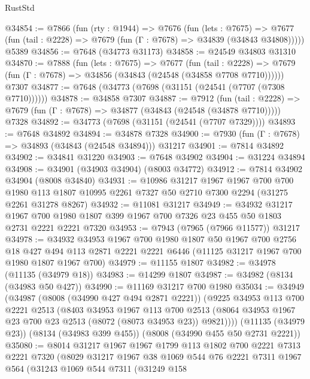 \begin{lexlean}{RustStd}
\begin{coremodule}
@34854 := @7866
    (fun (rty : @1944) =>
    @7676
      (fun (lets : @7675) =>
      @7677 (fun (tail : @2228) => @7679 (fun (Γ : @7678) => @34839 (@34843 @34808)))))
    @5389
@34856 := @7648 (@34773 @31173)
@34858 := @24549 @34803 @31310
@34870 := @7888
    (fun (lets : @7675) =>
    @7677
      (fun (tail : @2228) =>
      @7679 (fun (Γ : @7678) => @34856 (@34843 (@24548 (@34858 @7708 @7710))))))
    @7307
@34877 := @7648 (@34773 (@7698 (@31151 (@24541 (@7707 (@7308 @7710))))))
@34878 := @34858 @7307
@34887 := @7912
    (fun (tail : @2228) => @7679 (fun (Γ : @7678) => @34877 (@34843 (@24548 (@34878 @7710)))))
    @7328
@34892 := @34773 (@7698 (@31151 (@24541 (@7707 @7329))))
@34893 := @7648 @34892
@34894 := @34878 @7328
@34900 := @7930 (fun (Γ : @7678) => @34893 (@34843 (@24548 @34894))) @31217
@34901 := @7814 @34892
@34902 := @34841 @31220
@34903 := @7648 @34902
@34904 := @31224 @34894
@34908 := @34901 (@34903 @34904) (@8003 @34772)
@34912 := @7814 @34902 @34904 (@8008 @34840)
@34931 := @10986
    @31217
    @1967
    @1967
    @700
    @700
    @1980
    @113
    @1807
    @10995
    @2261
    @7327
    @50
    @2710
    @7300
    @2294
    (@31275 @2261 @31278 @8267)
@34932 := @11081 @31217
@34949 := @34932
    @31217
    @1967
    @700
    @1980
    @1807
    @399
    @1967
    @700
    @7326
    @23
    @455
    @50
    @1803
    @2731
    @2221
    @2221
    @7320
@34953 := @7943 (@7965 (@7966 @11577)) @31217
@34978 := @34932
    @34953
    @1967
    @700
    @1980
    @1807
    @50
    @1967
    @700
    @2756
    @18
    @427
    @494
    @113
    @2871
    @2221
    @2221
    @6446
    (@11125 @31217 @1967 @700 @1980 @1807 @1967 @700)
@34979 := @11155 @1807
@34982 := @34978 (@11135 (@34979 @18))
@34983 := @14299 @1807
@34987 := @34982 (@8134 (@34983 @50 @427))
@34990 := @11169 @31217 @700 @1980
@35034 := @34949
    (@34987
      (@8008 (@34990 @427 @494 @2871 @2221))
      (@9225
        @34953
        @113
        @700
        @2221
        @2513
        (@8403
          @34953
          @1967
          @113
          @700
          @2513
          (@8064 @34953 @1967 @23 @700 @23 @2513 (@8072 (@8073 @34953 @23)) @9821))))
    (@11135 (@34979 @23))
    (@8134 (@34983 @399 @455))
    (@8008 (@34990 @455 @50 @2731 @2221))
@35080 := @8014
    @31217
    @1967
    @1967
    @1799
    @113
    @1802
    @700
    @2221
    @7313
    @2221
    @7320
    (@8029
      @31217
      @1967
      @38
      @1069
      @544
      @76
      @2221
      @7311
      @1967
      @564
      (@31243
        @1069
        @544
        @7311
        (@31249
          @158

\end{coremodule}
\end{lexlean}
